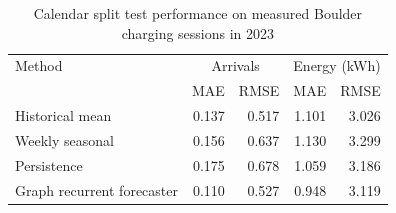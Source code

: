 \begin{table}[t]
\centering
\caption{Calendar split test performance on measured Boulder charging sessions in 2023}
\label{tab:real-ev-forecast}
\begin{tabular}{lrrrr}
\toprule
Method & \multicolumn{2}{c}{Arrivals} & \multicolumn{2}{c}{Energy (kWh)} \\
 & MAE & RMSE & MAE & RMSE \\
\midrule
Historical mean & 0.137 & 0.517 & 1.101 & 3.026 \\
Weekly seasonal & 0.156 & 0.637 & 1.130 & 3.299 \\
Persistence & 0.175 & 0.678 & 1.059 & 3.186 \\
Graph recurrent forecaster & 0.110 & 0.527 & 0.948 & 3.119 \\
\bottomrule
\end{tabular}
\end{table}

